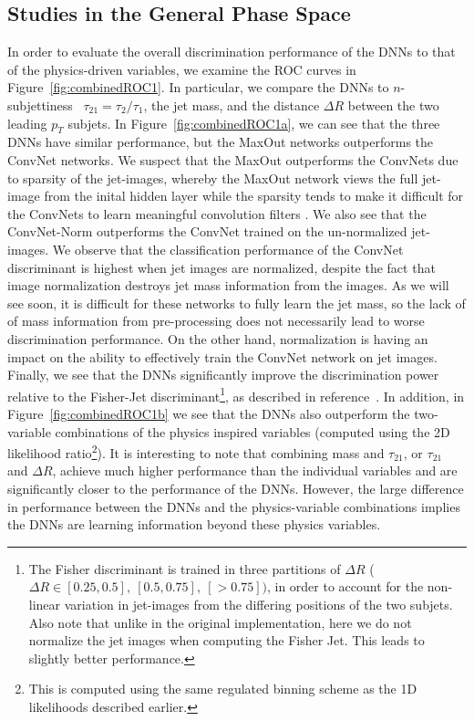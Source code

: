 
\subsection{Studies in the General Phase Space} %
\label{sub:coarse_studies}

In order to evaluate the overall discrimination performance of the DNNs to that of the physics-driven variables, we examine the ROC curves in Figure~\ref{fig:combinedROC1}. In particular, we compare the DNNs to $n$-subjettiness~\cite{nsub} $\tau_{21} = \tau_{2}/\tau_{1}$, the jet mass, and the distance $\Delta R$ between the two leading $p_{T}$ subjets.  In Figure~\ref{fig:combinedROC1a}, we can see that the three DNNs have similar performance, but the MaxOut networks outperforms the ConvNet networks.  We suspect that the MaxOut outperforms the ConvNets due to sparsity of the jet-images, whereby the MaxOut network views the full jet-image from the inital hidden layer while the sparsity tends to make it difficult for the ConvNets to learn meaningful convolution filters .  We also see that the ConvNet-Norm outperforms the ConvNet trained on the un-normalized jet-images.  We observe that the classification performance of the ConvNet discriminant is highest when jet images are normalized, despite the fact that image normalization destroys jet mass information from the images. As we will see soon, it is difficult for these networks to fully learn the jet mass, so the lack of of mass information from pre-processing does not necessarily lead to worse discrimination performance. On the other hand, normalization is having an impact on the ability to effectively train the ConvNet network on jet images.  Finally, we see that the DNNs significantly improve the discrimination power relative to the Fisher-Jet discriminant\footnote{The Fisher discriminant is trained in three partitions of $\Delta  R$ ($\Delta R \in [0.25, 0.5],\ [0.5, 0.75],\ [>0.75])$, in order to account for the non-linear variation in jet-images from the differing positions of the two subjets.  Also note that unlike in the original implementation, here we do not normalize the jet images when computing the Fisher Jet.  This leads to slightly better performance.}, as described in reference~\cite{Cogan:2014oua}. In addition, in Figure~\ref{fig:combinedROC1b} we see that the DNNs also outperform the two-variable combinations of the physics inspired variables (computed using the 2D likelihood ratio\footnote{This is computed using the same regulated binning scheme as the 1D likelihoods described earlier.}).   It is interesting to note that combining mass and $\tau_{21}$, or $\tau_{21}$ and $\Delta R$, achieve much higher performance than the individual variables and are significantly closer to the performance of the DNNs.  However, the large difference in performance between the DNNs and the physics-variable combinations implies the DNNs are learning information beyond these physics variables.
